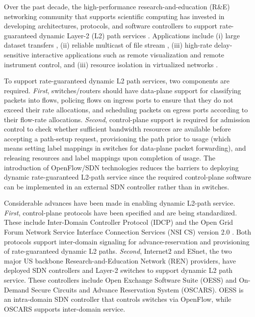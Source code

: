 
Over the past decade, the high-performance research-and-education (R\&E) networking
community that supports scientific computing has invested in developing architectures,
protocols, and
software controllers to support rate-guaranteed
dynamic Layer-2 (L2) path services \cite{1541694,4444698,4374315,1497551,4146687,OSCARS,OESS,1742-6596-396-4-042065}.
Applications include
(i) large dataset transfers \cite{UVA-CTRQ2013},
(ii) reliable multicast of file stream \cite{ji2015file},
(iii) high-rate delay-sensitive interactive
applications such as remote visualization and remote
instrument control, and (iii) resource isolation in virtualized networks \cite{GENI}.

To support rate-guaranteed dynamic L2 path services,
two components are required. \emph{First},
switches/routers should have data-plane support for classifying packets into flows, policing flows on ingress ports to ensure that they do not exceed their rate allocations, and scheduling packets on egress ports according to their flow-rate allocations. \emph{Second}, control-plane support
is required for admission control to check whether sufficient bandwidth resources are available before accepting a path-setup request, provisioning the path prior to usage (which means setting label mappings in switches for data-plane packet forwarding), and releasing resources and label mappings upon completion of usage. The introduction of OpenFlow/SDN technologies reduces the barriers to deploying dynamic rate-guaranteed L2-path service since the required control-plane software can be implemented in an external SDN controller rather than in switches.

Considerable advances have been made in enabling dynamic L2-path service.
\emph{First}, control-plane protocols have been specified and are being standardized. These
include Inter-Domain Controller Protocol (IDCP) \cite{IDCP} and the
Open Grid Forum Network Service Interface Connection Services (NSI CS) version 2.0 \cite{NSI}. Both protocols support
inter-domain signaling for advance-reservation and provisioning of rate-guaranteed
dynamic L2 paths. \emph{Second}, Internet2 and ESnet, the two major US backbone Research-and-Education
Network (REN) providers, have
deployed SDN controllers and Layer-2 switches to
support dynamic L2 path service. These controllers
include Open Exchange Software Suite (OESS)\cite{OESS} and
On-Demand Secure Circuits and Advance Reservation System (OSCARS)\cite{OSCARS}. OESS is an intra-domain
SDN controller that controls switches via OpenFlow, while
OSCARS supports inter-domain service.

